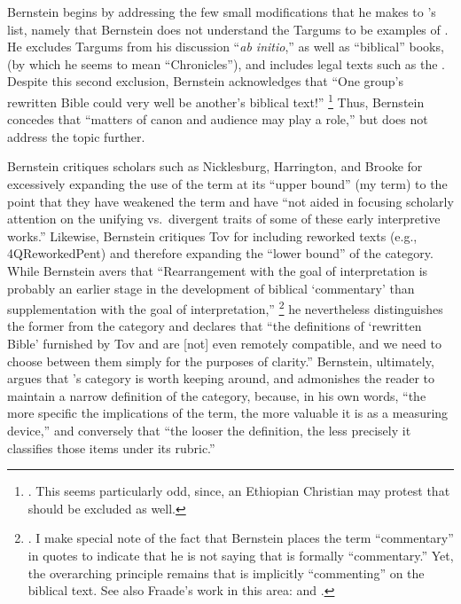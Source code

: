 Bernstein begins by addressing the few small modifications that he makes to \vermes's list, namely that Bernstein does not understand the Targums to be examples of \rwb. He excludes Targums from his discussion ``\emph{ab initio},'' as well as ``biblical'' books, (by which he seems to mean ``Chronicles''), and includes legal texts such as the \templescroll. Despite this second exclusion, Bernstein acknowledges that ``One group's rewritten Bible could very well be another's biblical text!''%
%
\footnote{\cite[175]{bernstein_textus2005}. This seems particularly odd, since, an Ethiopian Christian may protest that \jub should be excluded as well.}
%
Thus, Bernstein concedes that ``matters of canon and audience may play a role,'' but does not address the topic further. 

Bernstein critiques scholars such as Nicklesburg,\autocite{nickelsburg_stone1984} Harrington,\autocite{harrington_kraft-nickelsburg1986} and Brooke\autocite{brooke_schiffman-vanderkam2000} for excessively expanding the use of the term \rwb at its ``upper bound'' (my term) to the point that they have weakened the term and have ``not aided in focusing scholarly attention on the unifying vs.~divergent traits of some of these early interpretive works.''\autocite[179]{bernstein_textus2005} Likewise, Bernstein critiques Tov for including reworked texts (e.g., 4QReworkedPent) and therefore expanding the ``lower bound'' of the category. While Bernstein avers that ``Rearrangement with the goal of interpretation is probably an earlier stage in the development of biblical `commentary' than supplementation with the goal of interpretation,''%
%
\footnote{\cite[183]{bernstein_textus2005}. I make special note of the fact that Bernstein places the term ``commentary'' in quotes to indicate that he is not saying that \rwb is formally ``commentary.'' Yet, the overarching principle remains that \rwb is implicitly ``commenting'' on the biblical text. See also Fraade's work in this area: \cite{fraade_bakhos2006} and \cite{fraade_zsengeller2014}.}
%
he nevertheless distinguishes the former from the category \rwb and declares that ``the definitions of `rewritten Bible' furnished by Tov and \vermes are [not] even remotely compatible, and we need to choose between them simply for the purposes of clarity.''\autocite[185]{bernstein_textus2005} Bernstein, ultimately, argues that \vermes's category is worth keeping around, and admonishes the reader to maintain a narrow definition of the category, because, in his own words, ``the more specific the implications of the term, the more valuable it is as a measuring device,''\autocite[195]{bernstein_textus2005} and conversely that ``the looser the definition, the less precisely it classifies those items under its rubric.'' \autocite[195]{bernstein_textus2005} 

